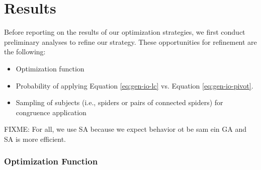 \chapter[Results]{Results} \label{ch:results}

Before reporting on the results of our optimization strategies, we first conduct preliminary analyses to refine our strategy.
These opportunities for refinement are the following:
\begin{itemize}
\item
  Optimization function
\item
  Probability of applying Equation \ref{eq:gen-io-lc} vs. Equation \ref{eq:gen-io-pivot}.
\item
  Sampling of subjects (i.e., spiders or pairs of connected spiders) for congruence application
\end{itemize}
FIXME: For all, we use SA because we expect behavior ot be sam ein GA and SA is more efficient.

\subsection*{Optimization Function}
